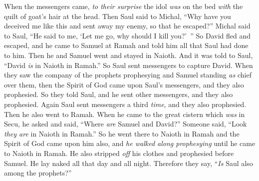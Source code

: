 \begin{biblechapter}
\verse When the messengers came, \textit{to their surprise} the idol \textit{was} on the bed \textit{with} the quilt of goat’s hair at the head.
\verse Then Saul said to Michal, “Why have you deceived me like this and sent away my enemy, so that he escaped?” Michal said to Saul, “He said to me, ‘Let me go, why should I kill you?’ ”
\verse So David fled and escaped, and he came to Samuel at Ramah and told him all that Saul had done to him. Then he and Samuel went and stayed in Naioth.
\verse And it was told to Saul, “David \textit{is} in Naioth in Ramah.”
\verse So Saul sent messengers to capture David. When they saw the company of the prophets prophesying and Samuel standing \textit{as} chief over them, then the Spirit of God came upon Saul’s messengers, and they also prophesied.
\verse So they told Saul, and he sent other messengers, and they also prophesied. Again Saul sent messengers a third \textit{time}, and they also prophesied.
\verse Then he also went to Ramah. When he came to the great cistern which \textit{was} in Secu, he asked and said, “Where \textit{are} Samuel and David?” Someone said, “Look \textit{they are} in Naioth in Ramah.”
\verse So he went there to Naioth in Ramah and the Spirit of God came upon him also, and \textit{he walked along prophesying} until he came to Naioth in Ramah.
\verse He also stripped \textit{off} his clothes and prophesied before Samuel. He lay naked all that day and all night. Therefore they say, “\textit{Is} Saul also among the prophets?”
\end{biblechapter}

